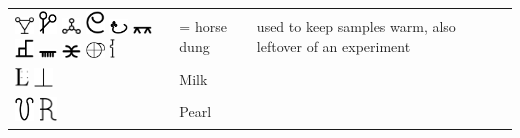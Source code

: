 \documentclass[british,final,landscape]{scrartcl}
\begin{document}
\begin{refsection}
\begin{supertabular}{p{0.3\textwidth}p{0.34\textwidth}p{0.34\textwidth}}
   \includegraphics[width=5mm]{Animal/HorseDung} \includegraphics[width=5mm]{Animal/HorseDung2} \includegraphics[width=5mm]{Animal/HorseDung3} \includegraphics[width=5mm]{Animal/HorseDung4} \includegraphics[width=5mm]{Animal/HorseDung5} \includegraphics[width=5mm]{Animal/HorseDung6} \includegraphics[width=5mm]{Animal/HorseDung7} \includegraphics[width=5mm]{Animal/HorseDung8} \includegraphics[width=5mm]{Animal/HorseDung9} \includegraphics[width=5mm]{Animal/HorseDung10} \includegraphics[height=5mm]{Animal/HorseDung11} &  = horse dung & used to keep samples warm, also leftover of an experiment \\
   \includegraphics[height=5mm]{Animal/Milk} \includegraphics[width=5mm]{Animal/Milk2} & Milk & \\
   \includegraphics[width=5mm]{Animal/Pearl} \includegraphics[width=5mm]{Animal/Pearl2} & Pearl & \\

\end{supertabular}
\end{refsection}
\end{document}
